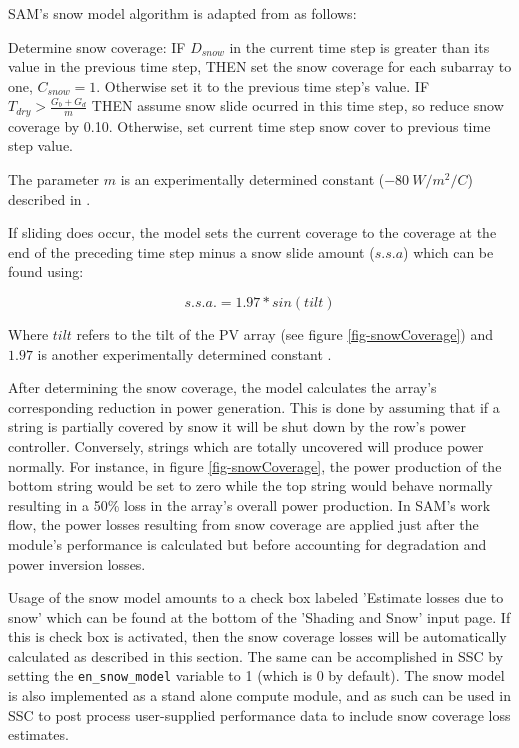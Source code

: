 \documentclass[12pt,letterpaper]{article}
\begin{document}
SAM's snow model algorithm is adapted from \citet{marion-snowmodel} as follows:

Determine snow coverage: IF $D_{snow}$ in the current time step is greater than its value in the previous time step, THEN set the snow coverage for each subarray to one, $C_{snow} = 1$. Otherwise set it to the previous time step's value.
IF $T_{dry}> \frac{G_{b}+G_{d}}{m}$ THEN assume snow slide ocurred in this time step, so reduce snow coverage by 0.10. Otherwise, set current time step snow cover to previous time step value.

The parameter $m$ is an experimentally determined constant ($-80\ W/m^2/C$) described in \citet{marion-snowmodel}. 

If sliding does occur, the model sets the current coverage to the coverage at the end of the preceding time step minus a snow slide amount ($s.s.a$) which can be found using:

\begin{equation}
	s.s.a. = 1.97 * sin( tilt )
	\label{eqn-snowSlideAmount}
\end{equation}

Where $tilt$ refers to the tilt of the PV array (see figure \ref{fig-snowCoverage}) and $1.97$ is another experimentally determined constant \citep{marion-snowmodel}.

After determining the snow coverage, the model calculates the array's corresponding reduction in power generation. This is done by assuming that if a string is partially covered by snow it will be shut down by the row's power controller. Conversely, strings which are totally uncovered will produce power normally. For instance, in figure \ref{fig-snowCoverage}, the power production of the bottom string would be set to zero while the top string would behave normally resulting in a 50\% loss in the array's overall power production. In SAM's work flow, the power losses resulting from snow coverage are applied just after the module's performance is calculated but before accounting for degradation and power inversion losses.

Usage of the snow model amounts to a check box labeled 'Estimate losses due to snow' which can be found at the bottom of the 'Shading and Snow' input page. If this is check box is activated, then the snow coverage losses will be automatically calculated as described in this section. The same can be accomplished in SSC by setting the \texttt{en\_snow\_model} variable to 1 (which is 0 by default). The snow model is also implemented as a stand alone compute module, and as such can be used in SSC to post process user-supplied performance data to include snow coverage loss estimates. 
\end{document}
